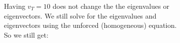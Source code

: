 \documentclass[preview]{standalone}
\begin{document}
\begin{center}
\raggedright
                Having $v_T = 10$ does not change the the eigenvalues or \\ 
                eigenvectors. We still solve for the eigenvalues and \\ 
                eigenvectors using the unforced (homogeneous) equation. \\ 
                So we still get:
\end{center}
\end{document}
